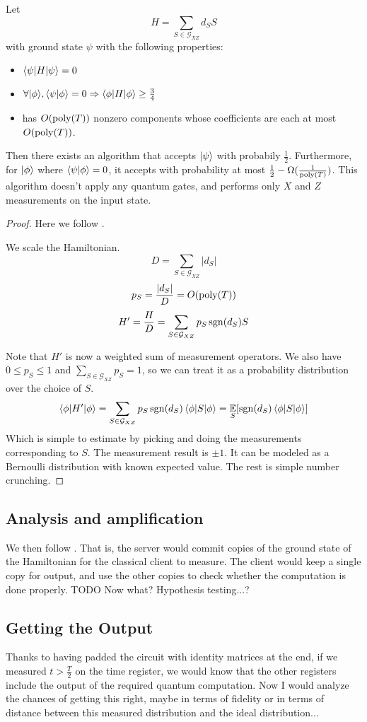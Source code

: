 \begin{theorem}
	Let $$H=\sum_{S\in\mathcal{G}_{XZ}} d_S S$$
	with ground state $\psi$ with the following properties:
	\begin{itemize}
		\item $\braket{\psi|H|\psi}=0$
		\item $\forall{\ket\phi}, \braket{\psi|\phi}=0\Rightarrow\braket{\phi|H|\phi}\geq\frac{3}{4}$
		\item has $O(\operatorname*{\operatorname{poly}}(T))$ nonzero components whose coefficients are each at most $O(\operatorname*{\operatorname{poly}}(T))$.
	\end{itemize}
	Then there exists an algorithm that accepts $\ket\psi$ with probabily $\frac{1}{2}$. Furthermore, for $\ket\phi$ where $\braket{\psi|\phi}=0$, it accepts with probability at most $\frac{1}{2}-\Omega(\frac{1}{\operatorname*{\operatorname{poly}}(T)})$. This algorithm doesn't apply any quantum gates, and performs only $X$ and $Z$ measurements on the input state.
\end{theorem}
\begin{proof}

Here we follow \cite{PhysRevA.93.022326}.

We scale the Hamiltonian.
$$D=\sum_{S\in\mathcal{G}_{XZ}}|d_S|$$
$$p_S=\frac{|d_S|}{D}=O(\operatorname*{\operatorname{poly}}(T))$$
$$H'=\frac{H}{D}=\sum_{S\in\mathcal{G}_{XZ}} p_S\operatorname{sgn}(d_S)S$$

Note that $H'$ is now a weighted sum of measurement operators. We also have $0\leq p_S\leq1$ and $\sum_{S\in\mathcal{G}_{XZ}} p_S=1$, so we can treat it as a probability distribution over the choice of $S$.
$$\braket{\phi|H'|\phi}=\sum_{S\in\mathcal{G}_{XZ}} p_S\operatorname{sgn}(d_S)\braket{\phi|S|\phi}=\operatorname*{\mathbb{E}}_S[\operatorname{sgn}(d_S)\braket{\phi|S|\phi}]$$
Which is simple to estimate by picking and doing the measurements corresponding to $S$. The measurement result is $\pm1$. It can be modeled as a Bernoulli distribution with known expected value. The rest is simple number crunching.
\end{proof}

\subsection{Analysis and amplification}

We then follow \cite{mahadev_delegation}. That is, the server would commit copies of the ground state of the Hamiltonian for the classical client to measure.
The client would keep a single copy for output, and use the other copies to check whether the computation is done properly.
TODO Now what? Hypothesis testing...?

\subsection{Getting the Output}

Thanks to having padded the circuit with identity matrices at the end, if we measured $t>\frac{T}{2}$ on the time register, we would know that the other registers include the output of the required quantum computation. Now I would analyze the chances of getting this right, maybe in terms of fidelity or in terms of distance between this measured distribution and the ideal distribution...
